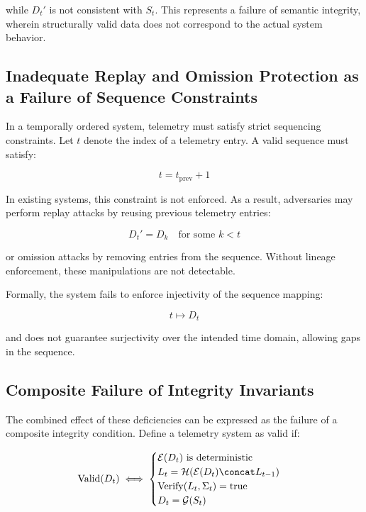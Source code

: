 while $D_t'$ is not consistent with $S_t$. This represents a failure of semantic integrity, wherein structurally valid data does not correspond to the actual system behavior.

\subsection{Inadequate Replay and Omission Protection as a Failure of Sequence Constraints}

In a temporally ordered system, telemetry must satisfy strict sequencing constraints. Let $t$ denote the index of a telemetry entry. A valid sequence must satisfy:

\begin{equation}
t = t_{\text{prev}} + 1
\end{equation}

In existing systems, this constraint is not enforced. As a result, adversaries may perform replay attacks by reusing previous telemetry entries:

\begin{equation}
D_t' = D_k \quad \text{for some } k < t
\end{equation}

or omission attacks by removing entries from the sequence. Without lineage enforcement, these manipulations are not detectable.

Formally, the system fails to enforce injectivity of the sequence mapping:

\begin{equation}
t \mapsto D_t
\end{equation}

and does not guarantee surjectivity over the intended time domain, allowing gaps in the sequence.

\subsection{Composite Failure of Integrity Invariants}

The combined effect of these deficiencies can be expressed as the failure of a composite integrity condition. Define a telemetry system as valid if:

\begin{equation}
\text{Valid}(D_t) \iff 
\begin{cases}
\mathcal{E}(D_t) \text{ is deterministic} \\
L_t = \mathcal{H}(\mathcal{E}(D_t) \concat L_{t-1}) \\
\text{Verify}(L_t, \Sigma_t) = \text{true} \\
D_t = \mathcal{G}(S_t)
\end{cases}
\end{equation}

